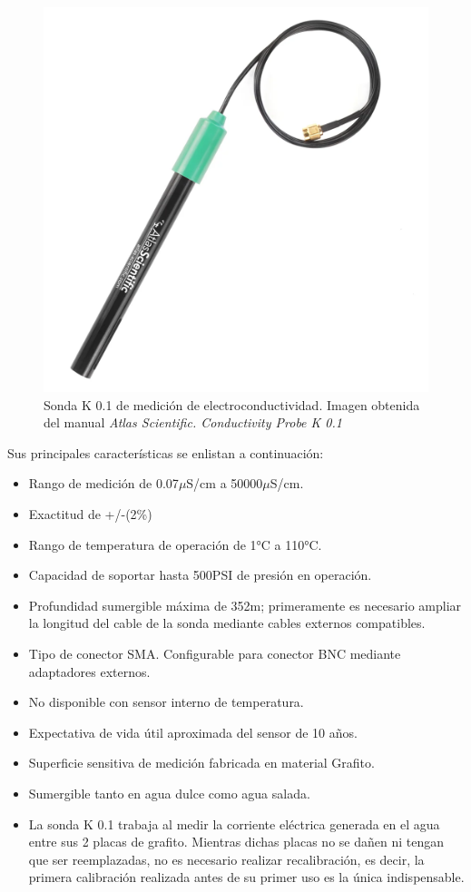 \begin{figure}[h]
	\centering
	\includegraphics[scale=0.2]{imgss113.png}
	\caption{Sonda K 0.1 de medición de electroconductividad. Imagen obtenida del manual \textit{Atlas Scientific. Conductivity Probe K 0.1}}
	\label{fig:figura500_4}
\end{figure}

Sus principales características se enlistan a continuación:

\begin{itemize}
    \item Rango de medición de 0.07$\mu$S/cm a 50000$\mu$S/cm.
    \item Exactitud de +/-(2\%)
    \item Rango de temperatura de operación de 1°C a 110°C.
    \item Capacidad de soportar hasta 500PSI de presión en operación.
    \item Profundidad sumergible máxima de 352m; primeramente es necesario ampliar la longitud del cable de la sonda mediante cables externos compatibles.
    \item Tipo de conector SMA. Configurable para conector BNC mediante adaptadores externos.
    \item No disponible con sensor interno de temperatura.
    \item Expectativa de vida útil aproximada del sensor de 10 años.
    \item Superficie sensitiva de medición fabricada en material Grafito.
    \item Sumergible tanto en agua dulce como agua salada.
    \item La sonda K 0.1 trabaja al medir la corriente eléctrica generada en el agua entre sus 2 placas de grafito. Mientras dichas placas no se dañen ni tengan que ser reemplazadas, no es necesario realizar recalibración, 
    es decir, la primera calibración realizada antes de su primer uso es la única indispensable. 
\end{itemize}

